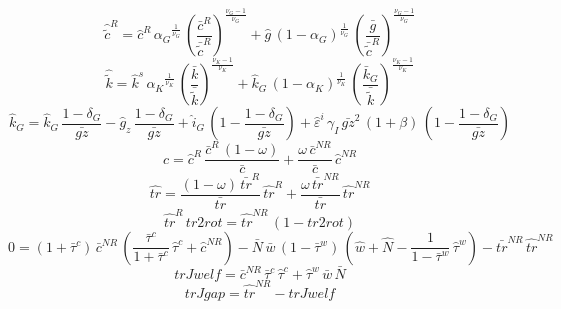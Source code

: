 \begin{dmath}
{\hat{\tilde{c}}^R}={\hat{c}^R}\, {\alpha_G}^{\frac{1}{{\nu_G}}}\, \left(\frac{{\bar{c}^R}}{{\bar{\tilde{c}}^R}}\right)^{\frac{{\nu_G}-1}{{\nu_G}}}+{\hat{g}}\, \left(1-{\alpha_G}\right)^{\frac{1}{{\nu_G}}}\, \left(\frac{{\bar{g}}}{{\bar{\tilde{c}}^R}}\right)^{\frac{{\nu_G}-1}{{\nu_G}}}
\end{dmath}
\begin{dmath}
{\hat{\tilde{k}}}={\hat{k}^s}\, {\alpha_K}^{\frac{1}{{\nu_K}}}\, \left(\frac{{\bar{k}}}{{\bar{\tilde{k}}}}\right)^{\frac{{\nu_K}-1}{{\nu_K}}}+{\hat{k}_G}\, \left(1-{\alpha_K}\right)^{\frac{1}{{\nu_K}}}\, \left(\frac{{\bar{k}_G}}{{\bar{\tilde{k}}}}\right)^{\frac{{\nu_K}-1}{{\nu_K}}}
\end{dmath}
\begin{dmath}
{\hat{k}_G}={\hat{k}_G}\, \frac{1-{\delta_G}}{{\bar{gz}}}-{{\hat{g}_z}}\, \frac{1-{\delta_G}}{{\bar{gz}}}+{\hat{i}_G}\, \left(1-\frac{1-{\delta_G}}{{\bar{gz}}}\right)+{\hat{\varepsilon}^i}\, {\gamma_I}\, {\bar{gz}}^{2}\, \left(1+{\beta}\right)\, \left(1-\frac{1-{\delta_G}}{{\bar{gz}}}\right)
\end{dmath}
\begin{dmath}
{\hat{c}}={\hat{c}^R}\, \frac{{\bar{c}^R}\, \left(1-{\omega}\right)}{{\bar{c}}}+\frac{{\omega}\, {\bar{c}^{NR}}}{{\bar{c}}}\, {\hat{c}^{NR}}
\end{dmath}
\begin{dmath}
{\hat{tr}}=\frac{\left(1-{\omega}\right)\, {\bar{tr}^{R}}}{{\bar{tr}}}\, {\hat{tr}^R}+\frac{{\omega}\, {\bar{tr}^{NR}}}{{\bar{tr}}}\, {\hat{tr}^{NR}}
\end{dmath}
\begin{dmath}
{\hat{tr}^R}\, {tr2rot}={\hat{tr}^{NR}}\, \left(1-{tr2rot}\right)
\end{dmath}
\begin{dmath}
0=\left(1+{\bar{\tau}^c}\right)\, {\bar{c}^{NR}}\, \left(\frac{{\bar{\tau}^c}}{1+{\bar{\tau}^c}}\, {\hat{\tau}^c}+{\hat{c}^{NR}}\right)-{\bar{N}}\, {\bar{w}}\, \left(1-{\bar{\tau}^w}\right)\, \left({\hat{w}}+{\hat{N}}-\frac{1}{1-{\bar{\tau}^w}}\, {\hat{\tau}^w}\right)-{\bar{tr}^{NR}}\, {\hat{tr}^{NR}}
\end{dmath}
\begin{dmath}
{trJwelf}={\bar{c}^{NR}}\, {\bar{\tau}^c}\, {\hat{\tau}^c}+{\hat{\tau}^w}\, {\bar{w}}\, {\bar{N}}
\end{dmath}
\begin{dmath}
{trJgap}={\hat{tr}^{NR}}-{trJwelf}
\end{dmath}
